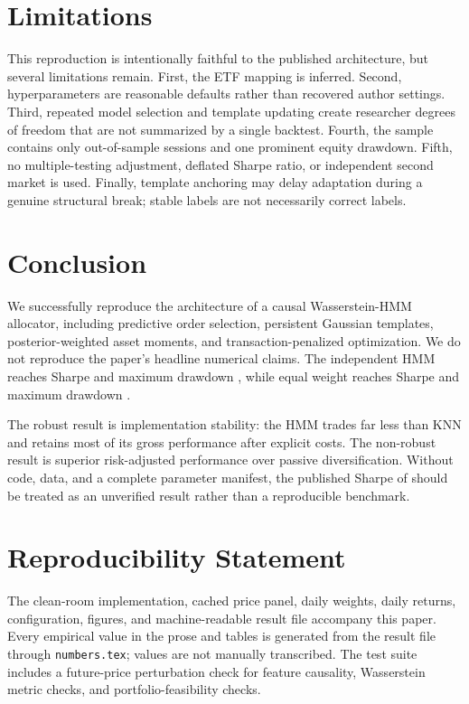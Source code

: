 \documentclass[11pt]{article}
\begin{document}
\section{Limitations}

This reproduction is intentionally faithful to the published architecture, but several limitations remain. First, the ETF mapping is inferred. Second, hyperparameters are reasonable defaults rather than recovered author settings. Third, repeated model selection and template updating create researcher degrees of freedom that are not summarized by a single backtest. Fourth, the sample contains only \OOSObs{} out-of-sample sessions and one prominent equity drawdown. Fifth, no multiple-testing adjustment, deflated Sharpe ratio, or independent second market is used. Finally, template anchoring may delay adaptation during a genuine structural break; stable labels are not necessarily correct labels.

\section{Conclusion}

We successfully reproduce the architecture of a causal Wasserstein-HMM allocator, including predictive order selection, persistent Gaussian templates, posterior-weighted asset moments, and transaction-penalized optimization. We do not reproduce the paper's headline numerical claims. The independent HMM reaches Sharpe \RepHMMSharpe{} and maximum drawdown \RepHMMMaxDD{}, while equal weight reaches Sharpe \RepEqualSharpe{} and maximum drawdown \RepEqualMaxDD{}.

The robust result is implementation stability: the HMM trades far less than KNN and retains most of its gross performance after explicit costs. The non-robust result is superior risk-adjusted performance over passive diversification. Without code, data, and a complete parameter manifest, the published Sharpe of \PubHMMSharpe{} should be treated as an unverified result rather than a reproducible benchmark.

\section*{Reproducibility Statement}

The clean-room implementation, cached price panel, daily weights, daily returns, configuration, figures, and machine-readable result file accompany this paper. Every empirical value in the prose and tables is generated from the result file through \texttt{numbers.tex}; values are not manually transcribed. The test suite includes a future-price perturbation check for feature causality, Wasserstein metric checks, and portfolio-feasibility checks.
\end{document}
